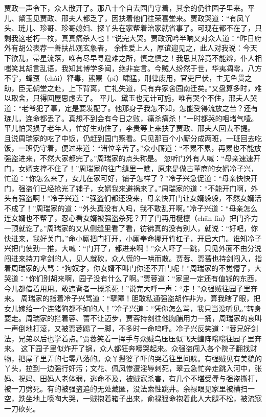 \documentclass[12pt,oneside]{book}
\begin{document}
贾政一声令下，众人散开了。那八十个自去园门守着，其余的仍往园子里来。平儿、黛玉见贾政、邢夫人都乏了，因扶着他们往荣喜堂来。贾政哭道：“有凤丫头、琏儿、珍哥、珍哥媳妇、探丫头在家帮着治家就省事了。可现在都不在了，只剩我这老朽一枚，真真痛杀人也！”说完大哭。贾政沉吟半晌又对众人道：“昨日府外有胡公表荐一善扶乩观玄象者， 余性爱上人，厚谊迎见之，此人对我说：今天下欲乱，帚星流落，唯有尽早寻避难之所，慎之慎之！我思其辞竟不能辨，仆人相嗤笑其胡言乱语，我知其博学多闻，绝非妄言。今贼人纷然于世，华夷凋零，八方不宁，蜂虿（chài）释毒，熊罴（pí）啸猛，刑律废用，官吏尸伏，主无鱼贯之助，臣无朝堂之赴，上下背离，亡礼失道，只有弃家舍园南迁矣。”又盘算多时，难以取舍，只得回屋思虑去了。
平儿、黛玉也无计可施，唯有哭个不住，邢夫人哭道：“老爷犯了事，定是要发配了。他那身子我怎不知，怎能受得流放之苦？还有琏儿，连命都丢了。真想不到会有今日之败，痛杀痛杀！”一时都哭的咽堵气噎。平儿怕哭损了老年人，忙好生劝住了，李贵等上来扶了贾政、邢夫人回去不提。
且说周瑞家的吃了中饭，仍赶到园门察看。只见那百个小厮分成两班，一班回去吃饭，一班仍守着，便过来道：“诸位辛苦了。”众小厮道：“不累不累，再累也不能放强盗进来，不然大家都完了。”周瑞家的点头称是。
忽听门外有人喊：“母亲速速开门，女婿支撑不住了！”周瑞家的往门缝里一瞧，原来是做古董商的女婿冷子兴，忙道：“你怎么来了，女儿在家可好，铺子怎样了？”冷子兴急促道：“母亲快快开门，强盗们已经抢光了铺子，女婿我来避祸来了。”周瑞家的道：“不能开门啊，外头有强盗啊！”冷子兴道：“强盗们都还没来，母亲快开门让女婿躲躲，不然女婿活不成了！”周瑞家的道：“外头真没有人吗，我不敢乱开啊。”冷子兴道：“母亲怎么连女婿也不帮了，忍心看女婿被强盗杀死？开了门再用梴檩（chān lǐn）把门齐力一顶就讫了。”周瑞家的又从侧缝里看了看，彷彿真的没有别人，就说：“好吧，你快进来，我好关门。”命小厮把门打开，小厮奉命挪开竹杠子，开启大门。谁知冷子兴把门使劲一推，大喊：“门开了，都进来啊！”众人吓了一跳，只见外面不由分说闯进来持刀拿剑的人，见人就砍，众人慌的一哄而散。贾蓉、贾蔷也持剑闯入，指着周瑞家的大骂：“狗奴才，你女婿不叫门你还不开门呢！”周瑞家的不觉懵了，大哭道：“你们别胡来啊，园子没有什么了啊。”贾蓉道：“家里一定还有值钱的东西，今儿都借着用用。敢违背者一概杀死！”说完大呼一声：“走！”众强贼往园子里奔来。
周瑞家的指着冷子兴骂道：“孽障！胆敢私通强盗胡作非为，算我瞎了眼，把女儿嫁给一个连猪狗都不如的人！”冷子兴道：“凭你怎么骂，我只当没听见。”转身要走。周瑞家的拦着蓉、蔷不让迈步，贾蓉持剑往他胸脯用力一捅，周瑞家的哀叫一声倒地打滚，又被贾蓉踢了一脚，不多时一命呜呼。冷子兴反笑道：“蓉兄好剑法，兄弟以后也学着点。”贾蓉笑着一挥手与众贼乌压压似飞天蝗阵嗡嗡往园子里奔来。
这下园子里似炸开了锅，众人都狂奔嚎哭起来。众强盗闯入各个院子翻找财物，把屋子里弄的七零八落的。众丫鬟婆子吓的哭着往里间躲。有强贼见有美貌的丫头，拉到一边强行奸污；文花、佩凤惨遭淫辱刺死，翠云急忙奔走跳入河中，张妈、祝妈、田妈人老体弱，逃命不及，被贼寇杀害，有几个不堪受辱与强盗撕打，被一刀劈死。有的被强盗追的无处藏匿，没法索性跳井。余禄眼见家里被横扫一空，跌坐地上嚎啕大哭，一贼抱着箱子出来，俞禄狠命抱着此人大腿不松，被流寇一刀砍死。
\end{document}
